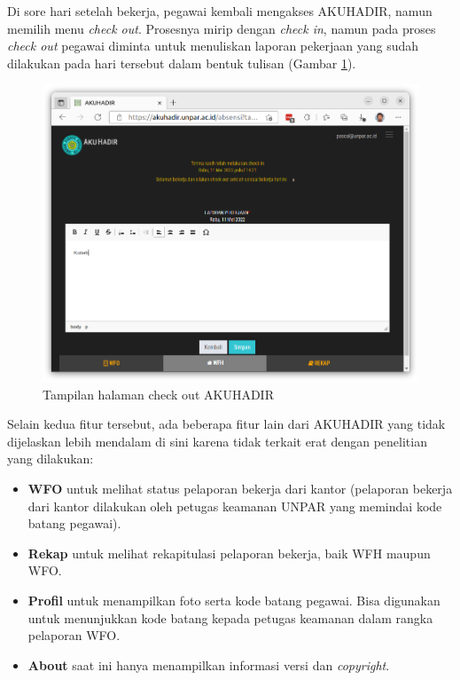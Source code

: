 Di sore hari setelah bekerja, pegawai kembali mengakses AKUHADIR, namun memilih menu \textit{check out}. Prosesnya mirip dengan \textit{check in}, namun pada proses \textit{check out} pegawai diminta untuk menuliskan laporan pekerjaan yang sudah dilakukan pada hari tersebut dalam bentuk tulisan (Gambar \ref{fig:akuhadir-4-wfh-checkout}).

\begin{figure}[H]
	\centering
	\includegraphics[scale=0.25]{Gambar/akuhadir-4-wfh-checkout.png}
	\caption{Tampilan halaman check out AKUHADIR} 
	\label{fig:akuhadir-4-wfh-checkout}
\end{figure}

Selain kedua fitur tersebut, ada beberapa fitur lain dari AKUHADIR yang tidak dijelaskan lebih mendalam di sini karena tidak terkait erat dengan penelitian yang dilakukan:

\begin{itemize}
	\item \textbf{WFO} untuk melihat status pelaporan bekerja dari kantor (pelaporan bekerja dari kantor dilakukan oleh petugas keamanan UNPAR yang memindai kode batang pegawai).
	\item \textbf{Rekap} untuk melihat rekapitulasi pelaporan bekerja, baik WFH maupun WFO.
	\item \textbf{Profil} untuk menampilkan foto serta kode batang pegawai. Bisa digunakan untuk menunjukkan kode batang kepada petugas keamanan dalam rangka pelaporan WFO.
	\item \textbf{About} saat ini hanya menampilkan informasi versi dan \textit{copyright}.
\end{itemize}

